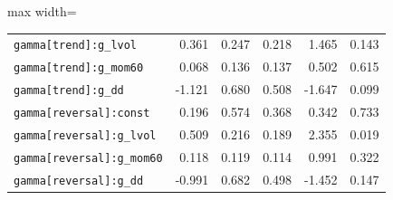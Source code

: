 \begin{table}[!htbp]
\begin{adjustbox}{max width=\textwidth}
\begin{tabular}{lrrrrr}
\texttt{gamma[trend]:g\_lvol} & 0.361 & 0.247 & 0.218 & 1.465 & 0.143\\
\texttt{gamma[trend]:g\_mom60} & 0.068 & 0.136 & 0.137 & 0.502 & 0.615\\
\texttt{gamma[trend]:g\_dd} & -1.121 & 0.680 & 0.508 & -1.647 & 0.099\\
\texttt{gamma[reversal]:const} & 0.196 & 0.574 & 0.368 & 0.342 & 0.733\\
\texttt{gamma[reversal]:g\_lvol} & 0.509 & 0.216 & 0.189 & 2.355 & 0.019\\
\texttt{gamma[reversal]:g\_mom60} & 0.118 & 0.119 & 0.114 & 0.991 & 0.322\\
\texttt{gamma[reversal]:g\_dd} & -0.991 & 0.682 & 0.498 & -1.452 & 0.147\\
\bottomrule
\end{tabular}
\end{adjustbox}
\end{table}
